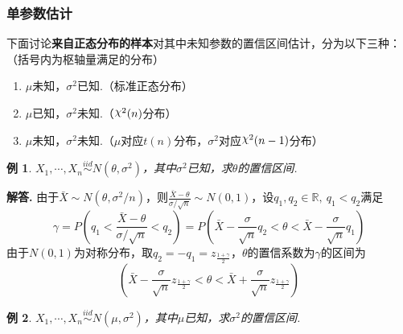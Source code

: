 \documentclass[12pt, a4paper, oneside]{ctexart}
\newtheorem{example}{例}[section]  %
\numberwithin{equation}{section}  %
\newenvironment{solution}[1][]{\par\noindent\textbf{#1解答. }}{\smallskip\par}  %
\DeclareRobustCommand{\rchi}{{\mathpalette\irchi\relax}}
\newcommand{\irchi}[2]{\raisebox{\depth}{$#1\chi$}} %
\def\R{\mathbb{R}}          %
\begin{document}
\subsubsection{单参数估计}
下面讨论\textbf{来自正态分布的样本}对其中未知参数的置信区间估计，分为以下三种：（括号内为枢轴量满足的分布）
\begin{enumerate}[label=(\arabic*)]
    \item $\mu$未知，$\sigma^2$已知.（标准正态分布）
    \item $\mu$已知，$\sigma^2$未知.（$\rchi^2(n)$分布）
    \item $\mu$未知，$\sigma^2$未知.（$\mu$对应$t(n)$分布，$\sigma^2$对应$\rchi^2(n-1)$分布）
\end{enumerate}
\begin{example}\label{example-sigma已知}
    $X_1,\cdots,X_n\overset{iid}{\sim}N(\theta,\sigma^2)$，其中$\sigma^2$已知，求$\theta$的置信区间.
\end{example}
\begin{solution}
    由于$\bar{X}\sim N(\theta,\sigma^2/n)$，则$\frac{\bar{X}-\theta}{\sigma/\sqrt{n}}\sim N(0,1)$，设$q_1,q_2\in\R,\ q_1<q_2$满足
    \begin{equation*}
        \gamma = P\left(q_1<\frac{\bar{X}-\theta}{\sigma/\sqrt{n}}<q_2\right)  = P\left(\bar{X}-\frac{\sigma}{\sqrt{n}}q_2<\theta<\bar{X}-\frac{\sigma}{\sqrt{n}}q_1\right)
    \end{equation*}
    由于$N(0,1)$为对称分布，取$q_2=-q_1 = z_{\frac{1+\gamma}{2}}$，$\theta$的置信系数为$\gamma$的区间为
    \begin{equation*}
        \left(\bar{X}-\frac{\sigma}{\sqrt{n}}z_{\frac{1+\gamma}{2}}<\theta<\bar{X}+\frac{\sigma}{\sqrt{n}}z_{\frac{1+\gamma}{2}}\right)
    \end{equation*}
\end{solution}
\begin{example}\label{example-mu已知}
    $X_1,\cdots,X_n\overset{iid}{\sim}N(\mu,\sigma^2)$，其中$\mu$已知，求$\sigma^2$的置信区间.
\end{example}
\end{document}
